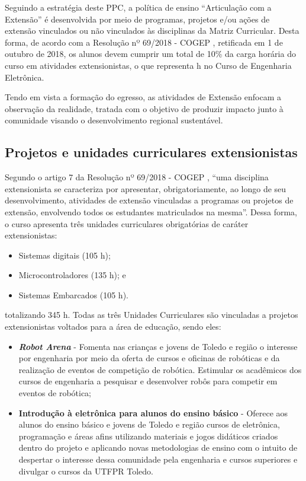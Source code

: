 Seguindo a estratégia deste PPC, a política de ensino ``Articulação com a Extensão'' é desenvolvida por meio de programas, projetos e/ou ações de extensão vinculados ou não vinculados às disciplinas da Matriz Curricular. Desta forma, de acordo com a Resolução nº 69/2018 - COGEP \cite{cogep69}, retificada em 1\textordmasculine{} de outubro de 2018, os alunos devem cumprir um total de 10\% da carga horária do curso em atividades extensionistas, o que representa \the\value{horasEXT} h no Curso de Engenharia Eletrônica.

Tendo em vista a formação do egresso, as atividades de Extensão enfocam a observação da realidade, tratada com o objetivo de produzir impacto junto à comunidade visando o desenvolvimento regional sustentável.

\subsection{Projetos e unidades curriculares extensionistas}

Segundo o artigo 7\textordmasculine{} da Resolução nº 69/2018 - COGEP \cite{cogep69}, ``uma disciplina extensionista se caracteriza por apresentar, obrigatoriamente, ao longo de seu desenvolvimento, atividades de extensão vinculadas a programas ou projetos de extensão, envolvendo todos os estudantes matriculados na mesma''. Dessa forma, o curso apresenta três unidades curriculares obrigatórias de caráter extensionistas:

\begin{itemize}
    \item Sistemas digitais (105 h);
    \item Microcontroladores (135 h); e
    \item Sistemas Embarcados (105 h).
\end{itemize}

\noindent totalizando 345 h. Todas as três Unidades Curriculares são vinculadas a projetos extensionistas voltados para a área de educação, sendo eles:

\begin{itemize}
    \item \textbf{\textit{Robot Arena}} - Fomenta nas crianças e jovens de Toledo e região o interesse por engenharia por meio da oferta de cursos e oficinas de robóticas e da realização de eventos de competição de robótica. Estimular os acadêmicos dos cursos de engenharia a pesquisar e desenvolver robôs para competir em eventos de robótica;
    \item \textbf{Introdução à eletrônica para alunos do ensino básico} - Oferece aos alunos do ensino básico e jovens de Toledo e região cursos de eletrônica, programação e áreas afins utilizando materiais e jogos didáticos criados dentro do projeto e aplicando novas metodologias de ensino com o intuito de despertar o interesse dessa comunidade pela engenharia e cursos superiores e divulgar o cursos da UTFPR Toledo.
\end{itemize}

